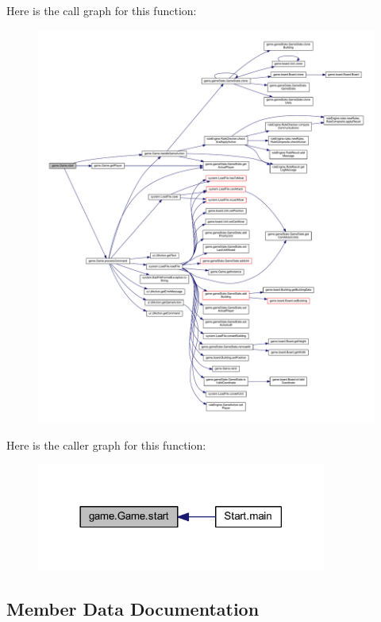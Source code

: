 Here is the call graph for this function\+:
\nopagebreak
\begin{figure}[H]
\begin{center}
\leavevmode
\includegraphics[width=350pt]{classgame_1_1_game_aaf75940b0f76230037ff41f72b73909d_cgraph}
\end{center}
\end{figure}
Here is the caller graph for this function\+:
\nopagebreak
\begin{figure}[H]
\begin{center}
\leavevmode
\includegraphics[width=270pt]{classgame_1_1_game_aaf75940b0f76230037ff41f72b73909d_icgraph}
\end{center}
\end{figure}


\subsection{Member Data Documentation}
\mbox{\label{classgame_1_1_game_a9b3fdf71d39fee9650f49b4dd320bcb2}} 
